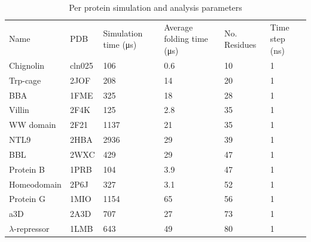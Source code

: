 \documentclass{article}
\begin{document}
\begin{table}
    \caption{Per protein simulation and analysis parameters}
    \begin{tabularx}{\textwidth}{llXXXX}
    \toprule
    Name & PDB & Simulation time (\si{\micro\second}) & Average folding time (\si{\micro\second}) & No. Residues & Time step (\si{\nano\second}) \\
     Chignolin           & cln025    & \num{106}     & \num{0.6} & 10 & \num{1} \\
    Trp-cage            & 2JOF      & \num{208}     & \num{14}  & 20 & \num{1} \\
    BBA                 & 1FME      & \num{325}     & \num{18}  & 28 & \num{1} \\
    Villin              & 2F4K      & \num{125}     & \num{2.8} & 35  &\num{1} \\
    WW domain           & 2F21      & \num{1137}    & \num{21}  & 35 & \num{1} \\
    NTL9                & 2HBA      & \num{2936}    & \num{29}  & 39  &\num{1} \\
    BBL                 & 2WXC      & \num{429}     & \num{29}  & 47  &\num{1} \\
    Protein B           & 1PRB      & \num{104}     & \num{3.9} & 47 & \num{1} \\
    Homeodomain         & 2P6J      & \num{327}     & \num{3.1} & 52 & \num{1} \\
    Protein G           & 1MIO      & \num{1154}    & \num{65}  & 56  &\num{1} \\
    a3D                 & 2A3D      & \num{707}     & \num{27}  & 73  &\num{1} \\
    $\lambda$-repressor & 1LMB      & \num{643}     & \num{49}  & 80  &\num{1} \\
    \bottomrule
    \end{tabularx}
    \label{tab:data_description}
\end{table}
\end{document}
